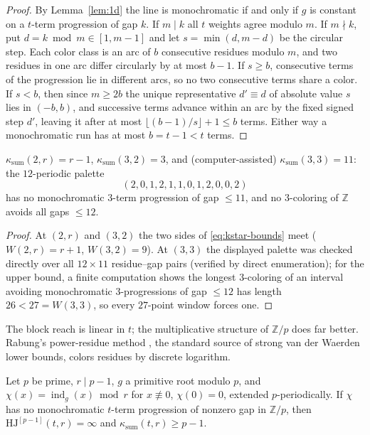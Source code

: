 \documentclass[12pt]{article}
\newcommand{\HJ}{\mathrm{HJ}}
\newcommand{\Wvdw}{W}
\newcommand{\Z}{\mathbb{Z}}
\newcommand{\ksum}{\kappa_{\mathrm{sum}}}
\DeclareMathOperator{\ind}{ind}
\begin{document}
\begin{proof}
By Lemma~\ref{lem:1d} the line is monochromatic if and only if $g$ is
constant on a $t$-term progression of gap $k$. If $m\mid k$ all $t$
weights agree modulo $m$. If $m\nmid k$, put $d=k\bmod m\in[1,m-1]$ and
let $s=\min(d,m-d)$ be the circular step. Each color class is an arc of
$b$ consecutive residues modulo $m$, and two residues in one arc differ
circularly by at most $b-1$. If $s\ge b$, consecutive terms of the
progression lie in different arcs, so no two consecutive terms share a
color. If $s<b$, then since $m\ge 2b$ the unique representative
$d'\equiv d$ of absolute value $s$ lies in $(-b,b)$, and successive
terms advance within an arc by the fixed signed step $d'$, leaving it
after at most $\lfloor(b-1)/s\rfloor+1\le b$ terms. Either way a
monochromatic run has at most $b=t-1<t$ terms.
\end{proof}

\begin{proposition}\label{prop:kstar}
$\ksum(2,r)=r-1$, $\ksum(3,2)=3$, and
\textup{(}computer-assisted\textup{)} $\ksum(3,3)=11$: the
$12$-periodic palette
\[
(2,0,1,2,1,1,0,1,2,0,0,2)
\]
has no monochromatic $3$-term progression of gap $\le 11$, and no
$3$-coloring of $\Z$ avoids all gaps $\le 12$.
\end{proposition}

\begin{proof}
At $(2,r)$ and $(3,2)$ the two sides of \eqref{eq:kstar-bounds} meet
($\Wvdw(2,r)=r+1$, $\Wvdw(3,2)=9$). At $(3,3)$ the displayed palette
was checked directly over all $12\times 11$ residue--gap pairs
(verified by direct enumeration); for the upper bound, a finite
computation \cite{thesis} shows the longest $3$-coloring of an interval
avoiding monochromatic $3$-progressions of gap $\le 12$ has length
$26<27=\Wvdw(3,3)$, so every $27$-point window forces one.
\end{proof}

The block reach is linear in $t$; the multiplicative structure of
$\Z/p$ does far better. Rabung's power-residue method \cite{Rabung1979},
the standard source of strong van der Waerden lower bounds, colors
residues by discrete logarithm.

\begin{theorem}\label{thm:character}
Let $p$ be prime, $r\mid p-1$, $g$ a primitive root modulo $p$, and
$\chi(x)=\ind_{g}(x)\bmod r$ for $x\not\equiv 0$, $\chi(0)=0$,
extended $p$-periodically. If $\chi$ has no monochromatic $t$-term
progression of nonzero gap in $\Z/p$, then
$\HJ^{[p-1]}(t,r)=\infty$ and $\ksum(t,r)\ge p-1$.
\end{theorem}
\end{document}
